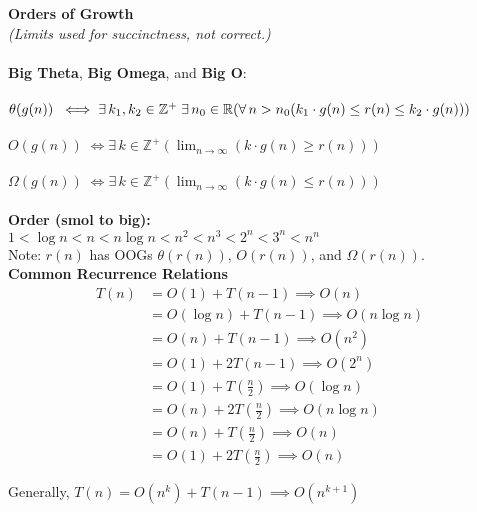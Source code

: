\documentclass[a4paper]{article} \usepackage[backend=biber, style=numeric, sorting=none]{biblatex}
\begin{document}
\begin{multicols*}{4}
\divider
\\ \\
{\small\textbf{Orders of Growth}}
\\
\textit{(Limits used for succinctness, not correct.)}\\ \\
\textbf{Big Theta},  \textbf{Big Omega}, and \textbf{Big O}:
\\ \\
$\theta(g(n))\; \iff \exists \, k_1, k_2 \in \mathbb{Z}^+ \; \exists \, n_0 \in \mathbb{R}  \\
( \forall \, n > n_0 (k_{1} \cdot g(n) \leq r(n) \leq k_{2} \cdot g(n))) $
\\ \\
$O(g(n))\; \iff \exists \, k \in \mathbb{Z}^+  ( \lim_{n \to \infty } (k \cdot g(n) \geq r(n) )) $
\\ \\
$\Omega(g(n))\; \iff \exists \, k \in \mathbb{Z}^+  ( \lim_{n \to \infty } (k \cdot g(n) \leq r(n) )) $
\\ \\
\textbf{Order (smol to big):} \\ $1 < \log n < n < n \log n < n^{2} < n^{3} < 2^{n} < 3^{n} < n^{n}$ \\

Note: $r(n)$ has OOGs $\theta(r(n))$, $O(r(n))$, and $\Omega(r(n))$. \\

{\textbf{Common Recurrence Relations}}
\begin{align*}
    T(n) & = O(1) + T(n-1) \implies O(n) \\
        & = O(\log n) + T(n-1) \implies O(n \log n) \\
        & = O(n) + T(n-1) \implies O(n^2) \\
        & = O(1) + 2T(n-1) \implies O(2^n) \\
        & = O(1) + T\left(\frac{n}{2}\right) \implies O(\log n) \\
        & = O(n) + 2T\left(\frac{n}{2}\right) \implies O(n \log n) \\ 
        & = O(n) + T\left(\frac{n}{2}\right) \implies O(n) \\
        & = O(1) + 2T\left(\frac{n}{2}\right) \implies O(n)
\end{align*}

Generally, $T(n) = O(n^k) + T(n-1)  \implies O(n^{k+1})$ \\

\vfill\null
\columnbreak



\end{multicols*}
\end{document}
